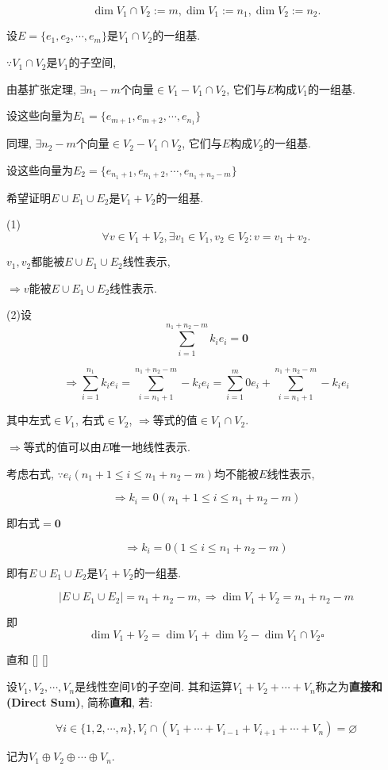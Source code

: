 \documentclass[UTF8]{ctexart}
\begin{document}
        \begin{prf}
			
			$$\dim V_1\cap V_2:=m, \dim V_{1}:=n_1, \dim V_{2}:=n_2. $$
			
			设$E=\{e_{1},e_{2},\cdots,e_{m}\}$是$V_1\cap V_2$的一组基. 
			
			$\because V_1\cap V_2$是$V_1$的子空间, 
			
			由基扩张定理, $\exists n_1-m$个向量$\in V_1-V_1\cap V_2$, 它们与$E$构成$V_1$的一组基. 
			
			设这些向量为$E_1=\{e_{m+1},e_{m+2},\cdots,e_{n_1}\}$
			
			同理, $\exists n_2-m$个向量$\in V_2-V_1\cap V_2$, 它们与$E$构成$V_2$的一组基. 
			
			设这些向量为$E_2=\{e_{n_1+1},e_{n_1+2},\cdots,e_{n_1+n_2-m}\}$
			
			希望证明$E\cup E_1\cup E_2$是$V_1+V_2$的一组基. 
			
			(1)$$\forall v\in V_1+V_2, \exists v_1\in V_1, v_2\in V_2: v=v_1+v_2. $$
			
			$v_1,v_2$都能被$E\cup E_1\cup E_2$线性表示, 
			
			$\Longrightarrow v$能被$E\cup E_1\cup E_2$线性表示. 
			
			(2)设$$\sum_{i=1}^{n_1+n_2-m}k_ie_i=\mathbf{0}$$
			
			$$\Longrightarrow\sum_{i=1}^{n_1}k_ie_i=\sum_{i=n_1+1}^{n_1+n_2-m}-k_ie_i=\sum_{i=1}^{m}0e_i+\sum_{i=n_1+1}^{n_1+n_2-m}-k_ie_i$$
			
			其中左式$\in V_1$, 右式$\in V_2$, $\Longrightarrow$等式的值$\in V_1\cap V_2$. 
			
			$\Longrightarrow$等式的值可以由$E$唯一地线性表示. 
			
			考虑右式, $\because e_i(n_1+1\leq i\leq n_1+n_2-m)$均不能被$E$线性表示,
			
			$$\Longrightarrow k_i=0(n_1+1\leq i\leq n_1+n_2-m)$$
			
			即右式$=\mathbf{0}$
			
			$$\Longrightarrow k_i=0(1\leq i\leq n_1+n_2-m)$$
			
			即有$E\cup E_1\cup E_2$是$V_1+V_2$的一组基. 
			
			$$|E\cup E_1\cup E_2|=n_1+n_2-m, \Longrightarrow\dim V_1+V_2=n_1+n_2-m$$
			
			即$$\dim V_{1}+V_{2}=\dim V_{1}+\dim V_{2}-\dim V_{1}\cap V_{2}\square$$
		\end{prf}
  
		\begin{dfn}
			[]
			{直和}
			[]
			[]

			设$V_1,V_2,\cdots,V_n$是线性空间$V$的子空间. 其和运算$V_1+V_2+\cdots+V_n$称之为\textbf{直接和(Direct Sum)}, 简称\textbf{直和}, 若: 
			
			$$\forall i\in\{1,2,\cdots,n\}, V_i\cap(V_1+\cdots+V_{i-1}+V_{i+1}+\cdots+V_n)=\varnothing$$
			
			记为$V_1\oplus V_2\oplus\cdots\oplus V_n$. 
		\end{dfn}
		
\end{document}
